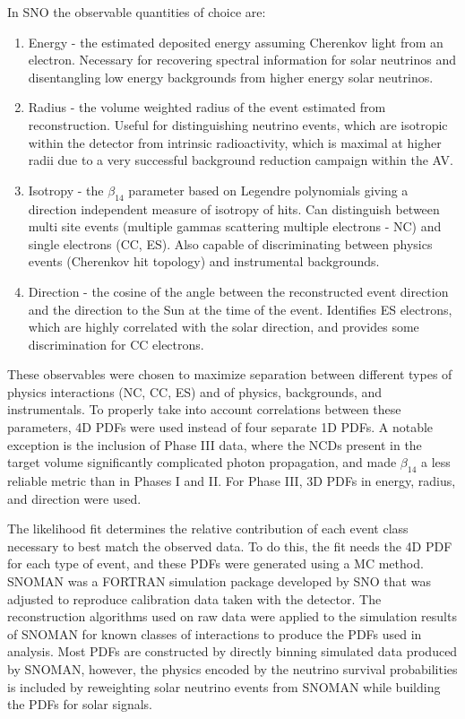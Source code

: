 In SNO the observable quantities of choice are:
\begin{enumerate}
    \item Energy - the estimated deposited energy assuming Cherenkov light from an electron. Necessary for recovering spectral information for solar neutrinos and disentangling low energy backgrounds from higher energy solar neutrinos.
    \item Radius - the volume weighted radius of the event estimated from reconstruction. Useful for distinguishing neutrino events, which are isotropic within the detector from intrinsic radioactivity, which is maximal at higher radii due to a very successful background reduction campaign within the AV.
    \item Isotropy - the $\beta_{14}$ parameter based on Legendre polynomials giving a direction independent measure of isotropy of hits. Can distinguish between multi site events (multiple gammas scattering multiple electrons - NC) and single electrons (CC, ES). Also capable of discriminating between physics events (Cherenkov hit topology) and instrumental backgrounds.
    \item Direction - the cosine of the angle between the reconstructed event direction and the direction to the Sun at the time of the event. Identifies ES electrons, which are highly correlated with the solar direction, and provides some discrimination for CC electrons.
\end{enumerate}
These observables were chosen to maximize separation between different types of physics interactions (NC, CC, ES) and of physics, backgrounds, and instrumentals. 
To properly take into account correlations between these parameters, 4D PDFs were used instead of four separate 1D PDFs.
A notable exception is the inclusion of Phase III data, where the NCDs present in the target volume significantly complicated photon propagation, and made $\beta_{14}$ a less reliable metric than in Phases I and II.
For Phase III, 3D PDFs in energy, radius, and direction were used.

The likelihood fit determines the relative contribution of each event class necessary to best match the observed data.
To do this, the fit needs the 4D PDF for each type of event, and these PDFs were generated using a MC method.
SNOMAN \cite{sno_nim} was a FORTRAN simulation package developed by SNO that was adjusted to reproduce calibration data taken with the detector.
The reconstruction algorithms used on raw data were applied to the simulation results of SNOMAN for known classes of interactions to produce the PDFs used in analysis.
Most PDFs are constructed by directly binning simulated data produced by SNOMAN, however, the physics encoded by the neutrino survival probabilities is included by reweighting solar neutrino events from SNOMAN while building the PDFs for solar signals.

